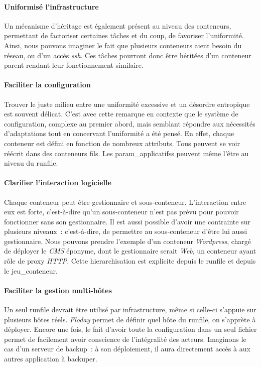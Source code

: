 \paragraph{Uniformisé l'infrastructure}
Un mécanisme d'héritage est également présent au niveau des \glspl{conteneur}, permettant de factoriser certaines tâches et du coup, de favoriser l'uniformité.
Ainsi, nous pouvons imaginer le fait que plusieurs conteneurs aient besoin du réseau, ou d'un accès \emph{ssh}.
Ces tâches pourront donc être héritées d'un conteneur parent rendant leur fonctionnement similaire.

\paragraph{Faciliter la configuration}
Trouver le juste milieu entre une uniformité excessive et un désordre entropique est souvent délicat.
C'est avec cette remarque en contexte que le système de configuration, complexe au premier abord, mais semblant répondre aux nécessités d'adaptations tout en concervant l'uniformité a été pensé.
En effet, chaque \gls{conteneur} est défini en fonction de nombreux \glspl{attribut}.
Tous peuvent se voir réécrit dans des conteneurs fils.
Les \glspl{param_applicatifs} peuvent même l'être au niveau du \gls{runfile}.

\paragraph{Clarifier l'interaction logicielle}
Chaque \gls{conteneur} peut être \gls{gestionnaire} et \gls{sous-conteneur}.
L'interaction entre eux est forte, c'est-à-dire qu'un sous-conteneur n'est pas prévu pour pouvoir fonctionner sans son gestionnaire.
Il est aussi possible d'avoir une contrainte sur plusieurs niveaux~: c'est-à-dire, de permettre au sous-conteneur d'être lui aussi gestionnaire.
Nous pouvons prendre l'exemple d'un conteneur \emph{Wordpress}, chargé de déployer le \emph{CMS} éponyme, dont le gestionnaire serait \emph{Web}, un conteneur ayant rôle de proxy \emph{HTTP}.
Cette hierarchisation est explicite depuis le \gls{runfile} et depuis le \gls{jeu_conteneur}.

\paragraph{Faciliter la gestion multi-hôtes}
Un seul \gls{runfile} devrait être utilisé par infrastructure, même si celle-ci s'appuie sur plusieurs hôtes réels.
\emph{Floday} permet de définir quel hôte du runfile, on s'apprète à déployer.
Encore une fois, le fait d'avoir toute la configuration dans un seul fichier permet de facilement avoir conscience de l'intégralité des acteurs.
Imaginons le cas d'un serveur de backup~: à son déploiement, il aura directement accès à aux autres \gls{application} à backuper.

